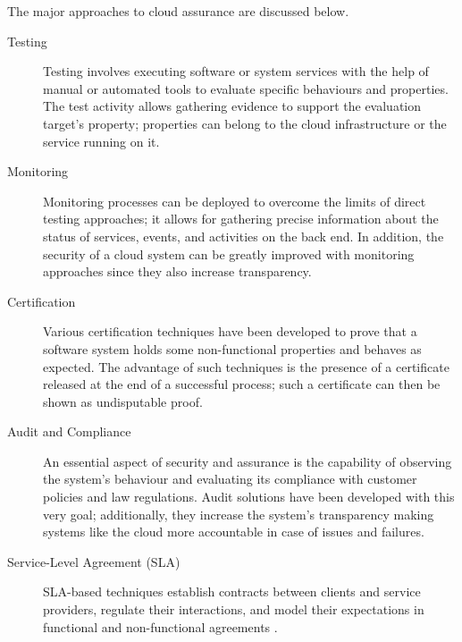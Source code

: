 The major approaches to cloud assurance are discussed below.
\begin{description}
    \item[Testing]
    Testing involves executing software or system services with the help of manual or automated tools to evaluate specific behaviours and properties. The test activity allows gathering evidence to support the evaluation target's property; properties can belong to the cloud infrastructure or the service running on it.

    \item[Monitoring]
    Monitoring processes can be deployed to overcome the limits of direct testing approaches; it allows for gathering precise information about the status of services, events, and activities on the back end. In addition, the security of a cloud system can be greatly improved with monitoring approaches since they also increase transparency.

    \item[Certification]
    Various certification techniques have been developed to prove that a software system holds some non-functional properties and behaves as expected. The advantage of such techniques is the presence of a certificate released at the end of a successful process; such a certificate can then be shown as undisputable proof.
    
    \item[Audit and Compliance]
    An essential aspect of security and assurance is the capability of observing the system's behaviour and evaluating its compliance with customer policies and law regulations. Audit solutions have been developed with this very goal; additionally, they increase the system's transparency making systems like the cloud more accountable in case of issues and failures.
    
    \item[Service-Level Agreement (SLA)]
    SLA-based techniques establish contracts between clients and service providers, regulate their interactions, and model their expectations in functional and non-functional agreements \cite{article}.

\end{description}



